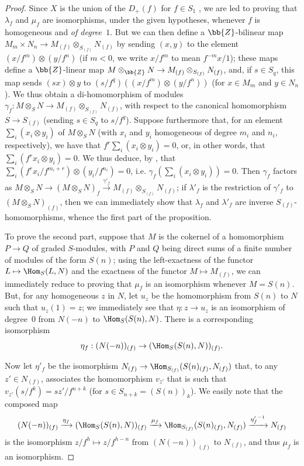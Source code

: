 \begin{proof}
Since $X$ is the union of the $D_+(f)$ for $f\in S_1$ , we are led to proving that $\lambda_f$ and $\mu_f$ are isomorphisms, under the given hypotheses, whenever $f$ is homogeneous and \emph{of degree~$1$}.
But we can then define a $\bb{Z}$-bilinear map $M_m\times N_n\to M_{(f)}\otimes_{S_{(f)}}N_{(f)}$ by sending $(x,y)$ to the element $(x/f^m)\otimes(y/f^n)$ (if $m<0$, we write $x/f^m$ to mean $f^{-m}x/1$);
these maps define a $\bb{Z}$-linear map $M\otimes_{\bb{Z}}N\to M_{(f)}\otimes_{S_{(f)}}N_{(f)}$, and, if $s\in S_q$, this map sends $(sx)\otimes y$ to $(s/f^q)((x/f^m)\otimes(y/f^n))$ (for $x\in M_m$ and $y\in N_n$).
We thus obtain a di-homomorphism of modules $\gamma_f: M\otimes_S N\to M_{(f)}\otimes_{S_{(f)}}N_{(f)}$, with respect to the canonical homomorphism $S\to S_{(f)}$ (sending $s\in S_q$ to $s/f^q$).
Suppose furthermore that, for an element $\sum_i(x_i\otimes y_i)$ of $M\otimes_S N$ (with $x_i$ and $y_i$ homogeneous of degree $m_i$ and $n_i$, respectively), we have that $f^r\sum_i(x_i\otimes y_i)=0$, or, in other words, that $\sum_i(f^rx_i\otimes y_i)=0$.
We thus deduce, by , that $\sum_i(f^rx_i/f^{m_i+r})\otimes(y_i/f^{n_i})=0$, i.e. $\gamma_f(\sum_i(x_i\otimes y_i))=0$.
Then $\gamma_f$ factors as $M\otimes_S N\to(M\otimes_S N)_f\xrightarrow{\gamma'_f}M_{(f)}\otimes_{S_{(f)}}N_{(f)}$;
  if $\lambda'_f$ is the restriction of $\gamma'_f$
to $(M\otimes_S N)_{(f)}$, then we can immediately show that $\lambda_f$ and $\lambda'_f$ are inverse $S_{(f)}$-homomorphisms, whence the first part of the proposition.

To prove the second part, suppose that $M$ is the cokernel of a homomorphism $P\to Q$ of graded $S$-modules, with $P$ and $Q$ being direct sums of a finite number of modules of the form $S(n)$;
  using the left-exactness of the functor $L\mapsto\Hom_S(L,N)$ and the exactness of the functor $M\mapsto M_{(f)}$, we can immediately reduce to proving that $\mu_f$ is an isomorphism whenever $M=S(n)$.
But, for any homogeneous $z$ in $N$, let $u_z$ be the homomorphism from $S(n)$ to $N$ such that $u_z(1)=z$;
we immediately see that $\eta: z\to u_z$ is an isomorphism of degree~$0$ from $N(-n)$ to $\Hom_S(S(n),N)$.
There is a corresponding isomorphism
\[
  \eta_f: (N(-n))_{(f)} \to (\Hom_S(S(n),N))_{(f)}.
\]

Now let $\eta'_f$ be the isomorphism $N_{(f)}\to\Hom_{S_{(f)}}(S(n)_{(f)},N_{(f)})$ that, to any $z'\in N_{(f)}$, associates the homomorphism $v_{z'}$ that is such that $v_{z'}(s/f^k)=sz'/f^{n+k}$ (for $s\in S_{n+k}=(S(n))_k$).
We easily note that the composed map
\[
  (N(-n))_{(f)}
  \xrightarrow{\eta_f} (\Hom_S(S(n),N))_{(f)}
  \xrightarrow{\mu_f} \Hom_{S_{(f)}}(S(n)_{(f)},N_{(f)})
  \xrightarrow{{\eta'_f}^{-1}} N_{(f)}
\]
is the isomorphism $z/f^h\mapsto z/f^{h-n}$ from $(N(-n))_{(f)}$ to $N_{(f)}$, and thus $\mu_f$ is an isomorphism.
\end{proof}

